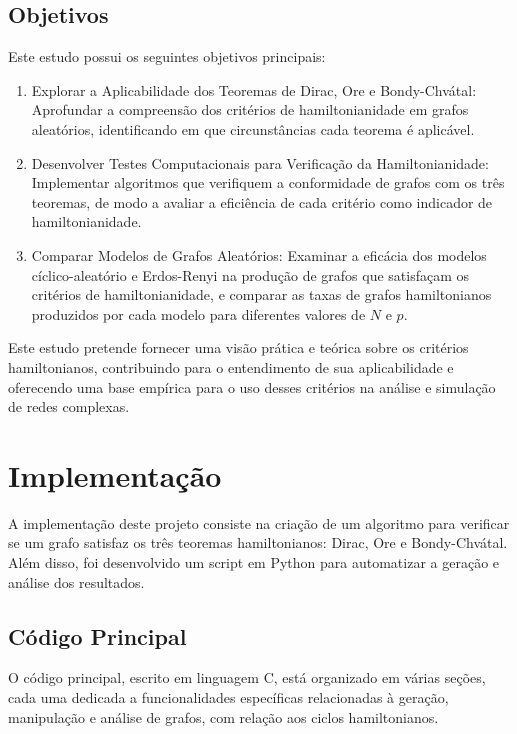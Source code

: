 \documentclass[12pt, openright, oneside, a4paper, chapter=TITLE, section=TITLE, subsection=TITLE, subsubsection=TITLE, brazil]{abntex2}
\begin{document}
\section{Objetivos}
Este estudo possui os seguintes objetivos principais:
\begin{enumerate}
    \item Explorar a Aplicabilidade dos Teoremas de Dirac, Ore e Bondy-Chvátal: Aprofundar a compreensão dos critérios de hamiltonianidade em grafos aleatórios, identificando em que circunstâncias cada teorema é aplicável.
    \item Desenvolver Testes Computacionais para Verificação da Hamiltonianidade: Implementar algoritmos que verifiquem a conformidade de grafos com os três teoremas, de modo a avaliar a eficiência de cada critério como indicador de hamiltonianidade.
    \item Comparar Modelos de Grafos Aleatórios: Examinar a eficácia dos modelos cíclico-aleatório e Erdos-Renyi na produção de grafos que satisfaçam os critérios de hamiltonianidade, e comparar as taxas de grafos hamiltonianos produzidos por cada modelo para diferentes valores de $N$ e $p$.
\end{enumerate}
Este estudo pretende fornecer uma visão prática e teórica sobre os critérios hamiltonianos, contribuindo para o entendimento de sua aplicabilidade e oferecendo uma base empírica para o uso desses critérios na análise e simulação de redes complexas.

\chapter{Implementação}
A implementação deste projeto consiste na criação de um algoritmo para verificar se um grafo satisfaz os três teoremas hamiltonianos: Dirac, Ore e Bondy-Chvátal. Além disso, foi desenvolvido um script em Python para automatizar a geração e análise dos resultados.

\section{Código Principal}
O código principal, escrito em linguagem C, está organizado em várias seções, cada uma dedicada a funcionalidades específicas relacionadas à geração, manipulação e análise de grafos, com relação aos ciclos hamiltonianos.
\end{document}
